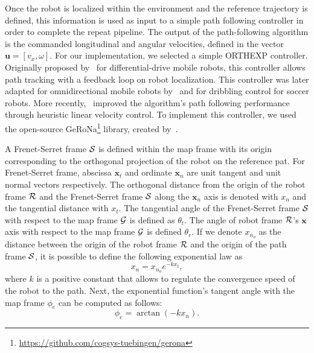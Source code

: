 Once the robot is localized within the environment and the reference trajectory is defined, this information is used as input to a simple path following controller in order to complete the repeat pipeline.
The output of the path-following algorithm is the commanded longitudinal and angular velocities, defined in the vector $\bm u = [v_x, \omega]$.
For our implementation, we selected a simple \ac{ORTHEXP} controller. 
Originally proposed by~\citet{Mojaev2004} for differential-drive mobile robots, this controller allows path tracking with a feedback loop on robot localization.
This controller was later adapted for omnidirectional mobile robots by~\citet{Li2007} and for dribbling control for soccer robots.
More recently,~\citet{Huskic2017} improved the algorithm's path following performance through heuristic linear velocity control.
To implement this controller, we used the open-source \ac{GeRoNa}\footnote{\url{https://github.com/cogsys-tuebingen/gerona}} library, created by~\citet{Huskic2019}.

A Frenet-Serret frame $\mathcal{S}$ is defined within the map frame with its origin corresponding to the orthogonal projection of the robot on the reference pat.
For Frenet-Serret frame, abscissa $\bm x_t$ and ordinate $\bm x_n$ are unit tangent and unit normal vectors respectively. 
The orthogonal distance from the origin of the robot frame $\mathcal{R}$ and the Frenet-Serret frame $\mathcal{S}$ along the $\bm x_n$ axis is denoted with $x_n$ and the tangential distance with $x_t$.
The tangential angle of the Frenet-Serret frame $\mathcal{S}$ with respect to the map frame $\mathcal{G}$ is defined as $\theta_t$.
The angle of robot frame $\mathcal{R}$'s $\bm x$ axis with respect to the map frame $\mathcal{G}$ is defined $\theta_r$. %
If we denote $x_{n_o}$ as the distance between the origin of the robot frame $\mathcal{R}$ and the origin of the path frame $\mathcal{S}$, it is possible to define the following exponential law as
\begin{equation}
\label{eq:exp_law}
	x_n = x_{n_o} e^{-k x_t},
\end{equation}
where $k$ is a positive constant that allows to regulate the convergence speed of the robot to the path.
Next, the exponential function's tangent angle with the map frame $\phi_e$ can be computed as follows:
\begin{equation}
\label{eq:exp_angle}
\phi_e = \arctan(-k x_n).
\end{equation}

